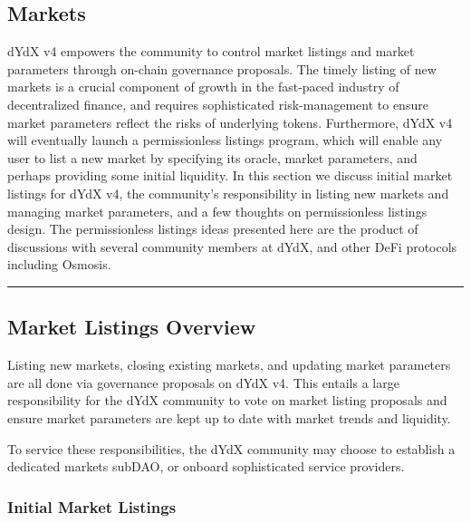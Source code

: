 \begin{fullwidth}
    \section{Markets} \label{sec:markets}

    \begin{adjustwidth}{2cm}{2cm}
        \justify
        dYdX v4 empowers the community to control market listings and market parameters through on-chain governance proposals. The timely listing of new markets is a crucial component of growth in the fast-paced industry of decentralized finance, and requires sophisticated risk-management to ensure market parameters reflect the risks of underlying tokens. Furthermore, dYdX v4 will eventually launch a permissionless listings program, which will enable any user to list a new market by specifying its oracle, market parameters, and perhaps providing some initial liquidity. In this section we discuss initial market listings for dYdX v4, the community's responsibility in listing new markets and managing market parameters, and a few thoughts on permissionless listings design. The permissionless listings ideas presented here are the product of discussions with several community members at dYdX, and other DeFi protocols including Osmosis.
    \end{adjustwidth}
    
    \textcolor{gray}{\rule{\linewidth}{0.1mm}}

\end{fullwidth}

    \subsection{Market Listings Overview} \label{subsec:markets}

        Listing new markets, closing existing markets, and updating market parameters are all done via governance proposals on dYdX v4. This entails a large responsibility for the dYdX community to vote on market listing proposals and ensure market parameters are kept up to date with market trends and liquidity.

        To service these responsibilities, the dYdX community may choose to establish a dedicated markets subDAO, or onboard sophisticated service providers.

        \subsubsection{Initial Market Listings}

